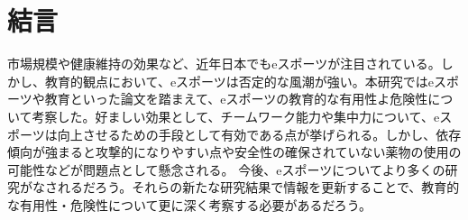 \section{結言}

市場規模や健康維持の効果など、近年日本でもeスポーツが注目されている。しかし、教育的観点において、eスポーツは否定的な風潮が強い。本研究ではeスポーツや教育といった論文を踏まえて、eスポーツの教育的な有用性よ危険性について考察した。好ましい効果として、チームワーク能力や集中力について、eスポーツは向上させるための手段として有効である点が挙げられる。しかし、依存傾向が強まると攻撃的になりやすい点や安全性の確保されていない薬物の使用の可能性などが問題点として懸念される。
今後、eスポーツについてより多くの研究がなされるだろう。それらの新たな研究結果で情報を更新することで、教育的な有用性・危険性について更に深く考察する必要があるだろう。